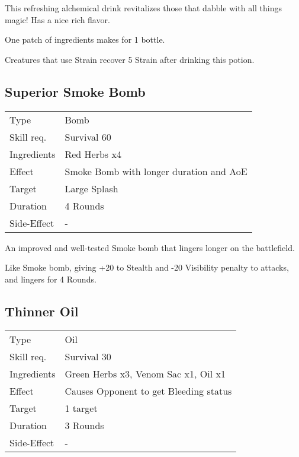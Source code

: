 \documentclass[11pt,a4paper,twocolumn]{book}
\begin{document}
\medskip

This refreshing alchemical drink revitalizes those that dabble with all things magic! Has a nice rich flavor.

One patch of ingredients makes for 1 bottle.

Creatures that use Strain recover 5 Strain after drinking this potion.

\vfill

\subsection*{Superior Smoke Bomb}
{
	\begin{tabu} to 75mm{| X[l,4] | X[l,8] |}
		\hline
		Type 			& Bomb 														\\
		Skill req.	    & Survival 60 												\\
		Ingredients     & Red Herbs x4												\\
		Effect     		& Smoke Bomb with longer duration and AoE 					\\
		Target      	& Large Splash												\\
		Duration  		& 4 Rounds 												\\
		Side-Effect     & -															\\ \hline
	\end{tabu}
	
}

\medskip

An improved and well-tested Smoke bomb that lingers longer on the battlefield.

Like Smoke bomb, giving +20 to Stealth and -20 Visibility penalty to attacks, and lingers for 4 Rounds.


\subsection*{Thinner Oil}
{
	\begin{tabu} to 75mm{| X[l,4] | X[l,8] |}
		\hline
		Type 			& Oil 														\\
		Skill req.	    & Survival 30 												\\
		Ingredients     & Green Herbs x3, Venom Sac x1, Oil x1						\\
		Effect     		& Causes Opponent to get Bleeding status 					\\
		Target      	& 1 target													\\
		Duration  		& 3 Rounds	 												\\
		Side-Effect     & -															\\ \hline
	\end{tabu}
	
}
\end{document}
